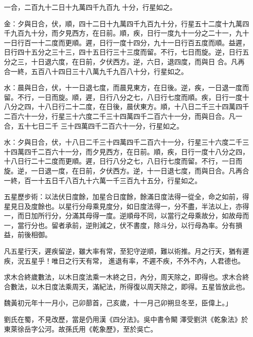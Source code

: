 \begin{pinyinscope}
 一合，二百九十二日十九萬四千九百九
 十分，行星如之。



 金：夕與日合，伏，順，四十二日十九萬四千九百九十分，行星五十二度十九萬四千九百九十分，而夕見西方，在日前。順，疾，日行一度九十一分之二十一，九十一日行百一十二度而更順。遲，日行一度十四分，九十一日行百五度而順。益遲，日行四十五分之三十三，四十五日行三十三度而留。不行，七日而旋。逆，日行五分之三，十日退六度，在日前，夕伏西方。逆，六日，退四度，而與日
 合。凡再合一終，五百八十四日三十八萬九千九百八十分，行星如之。



 水：晨與日合，伏，十一日退七度，而晨見東方，在日後。逆，疾，一日退一度而留。不行，一日而旋。順，遲，日行八分之七，八日行七度而順。疾，日行一度十八分之四，十八日行二十二度，在日後，晨伏東方。順，十八日二千三十四萬四千二百六十一分，行星三十六度二千三十四萬四千二百六十一分，而與日合。凡一合，五十七日二千
 三十四萬四千二百六十一分，行星如之。



 水：夕與日合，伏，十八日二千三十四萬四千二百六十一分，行星三十六度二千三十四萬四千二百六十一分，而夕見西方，在日前。順，疾，日行一度十八分之四，十八日行二十二度而更順。遲，日行八分之七，八日行七度而留。不行，一日而旋。逆，一日退一度，在日前，夕伏西方。逆，十一日退七度，而與日合。凡再合一終，百一十五日千八百九十六萬一千三百九十五分，行星如之。



 五星歷步術：以法伏日度餘，加星合日度餘，餘滿日度法得一從全，命之如前，得星見日及度餘也。以星行分母乘見度分，如日度法得一，分不盡，半法以上，亦得一，而日加所行分，分滿其母得一度。逆順母不同，以當行之母乘故分，如故母而一，當行分也。留者承前，逆則減之，伏不書度，除斗分，以行母為率。分有損益，前後相御。



 凡五星行天，遲疾留逆，雖大率有常，至犯守逆順，難以術推。月之行天，猶有遲疾，況五星乎！唯日之行天有常，
 進退有率，不遲不疾，不外不內，人君德也。



 求木合終歲數法，以木日度法乘一木終之日，內分，周天除之，即得也。求木合終合數法，以木日度法乘周天，滿紀法，所得復以周天除之，即得。五星皆放此也。



 魏黃初元年十一月小，己卯蔀首，己亥歲，十一月己卯朔旦冬至，臣偉上。」



 劉氏在蜀，不見改歷，當是仍用漢《四分法》。吳中書令闞
 澤受劉洪《乾象法》於東萊徐岳字公河。故孫氏用《乾象歷》，至於吳亡。




\end{pinyinscope}
